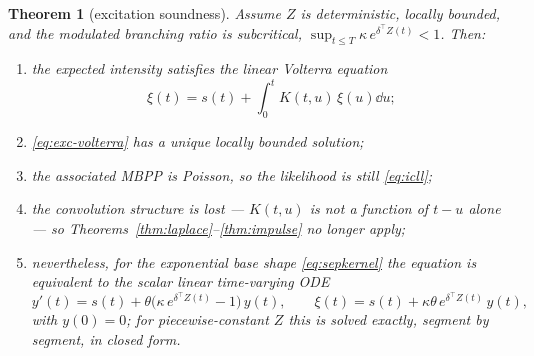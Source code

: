 \documentclass[11pt]{article}
\theoremstyle{plain}
\newtheorem{theorem}{Theorem}[section]
\theoremstyle{definition}
\theoremstyle{remark}
\begin{document}
\begin{theorem}[excitation soundness]
\label{thm:excitation}
Assume $Z$ is deterministic, locally bounded, and the modulated branching ratio
is subcritical, $\sup_{t\le T}\kappa\,e^{\delta^\top Z(t)}<1$. Then:
\begin{enumerate}[label=\textup{(\roman*)},leftmargin=2.2em,itemsep=2pt]
\item the expected intensity satisfies the linear Volterra equation
\begin{equation}
\xi(t)=s(t)+\int_0^t K(t,u)\,\xi(u)\dd u;
\label{eq:exc-volterra}
\end{equation}
\item \eqref{eq:exc-volterra} has a unique locally bounded solution;
\item the associated MBPP is Poisson, so the likelihood is still \eqref{eq:icll};
\item the convolution structure is \emph{lost} --- $K(t,u)$ is not a function of
$t-u$ alone --- so Theorems~\ref{thm:laplace}--\ref{thm:impulse} no longer apply;
\item nevertheless, for the exponential base shape \eqref{eq:sepkernel} the
equation is equivalent to the scalar linear time-varying ODE
\begin{equation}
y'(t)=s(t)+\theta\big(\kappa\,e^{\delta^\top Z(t)}-1\big)\,y(t),\qquad
\xi(t)=s(t)+\kappa\theta\,e^{\delta^\top Z(t)}\,y(t),
\label{eq:ltv}
\end{equation}
with $y(0)=0$; for piecewise-constant $Z$ this is solved \emph{exactly}, segment
by segment, in closed form.
\end{enumerate}
\end{theorem}
\end{document}
